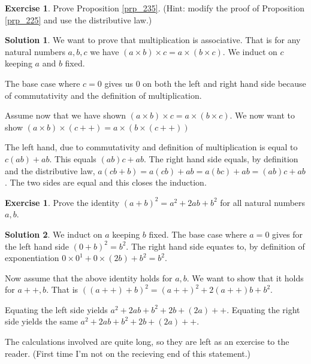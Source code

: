 \documentclass[a4paper, twocolumn]{report}
\newcounter{exercise} \numberwithin{exercise}{section}
\theoremstyle{definition}
\newtheorem{exc}[exercise]{Exercise}
\theoremstyle{solution}
\newtheorem*{sltn}{Solution}
\newcommand{\dplus}{{+}{+}} %
\begin{document}
\begin{exc}
  Prove Proposition \ref{prp_235}. (Hint: modify the proof of Proposition
  \ref{prp_225} and use the distributive law.) 
\end{exc}

\begin{sltn}
  We want to prove that multiplication is associative.
  That is for any natural numbers $a, b, c$ we have $(a\times b)\times c = a \times (b \times c)$.
  We induct on $c$ keeping $a$ and $b$ fixed.

  The base case where $c = 0$ gives us $0$ on both the left and right hand side
  because of commutativity and the definition of multiplication.

  Assume now that we have shown $(a\times b)\times c = a \times (b \times c)$. We now want to show
  $(a\times b)\times (c\dplus) = a \times (b \times (c\dplus))$

  The left hand, due to commutativity and definition of multiplication is equal
  to $c(ab) + ab$.  This equals $(ab)c + ab$. The right hand side equals, by
  definition and the distributive law, $a(cb + b) = a(cb) + ab = a(bc) + ab = (ab)c + ab$. The two sides
  are equal and this closes the induction.  

\end{sltn}

\begin{exc}
  Prove the identity $\left( a + b \right)^{2} = a^{2} + 2ab + b^{2}$ for all
  natural numbers $a, b$. 
\end{exc}
\begin{sltn}
  We induct on $a$ keeping $b$ fixed.  The base case where $a = 0$ gives for
  the left hand side $(0 + b)^{2} = b^{2}$.  The right hand side equates to, by
  definition of exponentiation $0\times 0^{1} + 0\times(2b) + b^{2} = b^2$.
  
  Now assume that the above identity holds for $a, b$. We want to show that it holds for
  $a\dplus, b$.
  That is $\left( (a\dplus) + b  \right)^{2} = (a\dplus)^{2} + 2(a\dplus)b + b^{2}$.
  
  Equating the left side yields $a^{2} + 2ab + b^{2} + 2b + (2a)\dplus$.
  Equating the right side yields the same $a^{2} + 2ab + b^2 + 2b + (2a)\dplus$.
  
  The calculations involved are quite long, so they are left as an exercise to
  the reader. (First time I'm not on the recieving end of this statement.)
\end{sltn}
\end{document}
